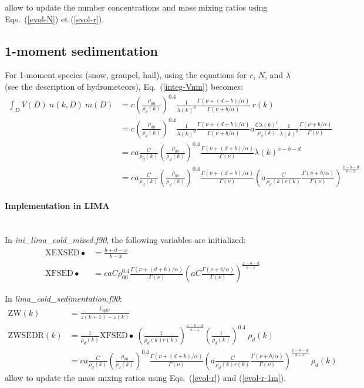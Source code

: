 allow to update the number concentrations and mass mixing ratios using Eqs.\ (\ref{evol-N}) et (\ref{evol-r}).

\subsection{1-moment sedimentation}

For 1-moment species (snow, graupel, hail), using the equations for $r$, $N$, and $\lambda$ (see the description of hydrometeors), Eq.\ (\ref{integ-Vnm}) becomes:
\begin{align}
 \int_D V(D)~n(k,D)~m(D) &= c \left(\frac{\rho_{00}}{\rho_d(k)}\right)^{0.4} \frac{1}{\lambda(k)^d} \frac{\Gamma(\nu+(d+b)/\alpha)}{\Gamma(\nu+b/\alpha)} ~ r(k) \\
 &= c \left(\frac{\rho_{00}}{\rho_d(k)}\right)^{0.4} \frac{1}{\lambda(k)^d} \frac{\Gamma(\nu+(d+b)/\alpha)}{\Gamma(\nu+b/\alpha)} a \frac{C \lambda(k)^{x}}{\rho_d(k)}\frac{1}{\lambda(k)^b} \frac{\Gamma(\nu + b/\alpha)}{\Gamma(\nu)} \\
 &= ca\frac{C}{\rho_d(k)} \left(\frac{\rho_{00}}{\rho_d(k)}\right)^{0.4} \frac{\Gamma(\nu+(d+b)/\alpha)}{\Gamma(\nu)} \lambda(k)^{x-b-d} \\
 \label{evol-r-1m}
 &= ca\frac{C}{\rho_d(k)} \left(\frac{\rho_{00}}{\rho_d(k)}\right)^{0.4} \frac{\Gamma(\nu+(d+b)/\alpha)}{\Gamma(\nu)} \left( a \frac{C}{\rho_d(k) r(k)} \frac{\Gamma(\nu+b/\alpha)}{\Gamma(\nu)}\right)^{\frac{x-b-d}{b-x}}
\end{align}

\paragraph{Implementation in LIMA}
~\\
In \emph{ini\_lima\_cold\_mixed.f90}, the following variables are initialized:
\begin{align}
 \mathrm{XEXSED\bullet} &= \frac{b+d-x}{b-x} \\
 \mathrm{XFSED\bullet} &= caC \rho_{00}^{0.4} \frac{\Gamma(\nu+(d+b)/\alpha)}{\Gamma(\nu)} \left( aC \frac{\Gamma(\nu+b/\alpha)}{\Gamma(\nu)} \right)^{\frac{x-b-d}{b-x}}
\end{align}

In \emph{lima\_cold\_sedimentation.f90}:
\begin{align}
 \mathrm{ZW}(k) &= \frac{t_{split}}{z(k+1)-z(k)} \\
 \mathrm{ZWSEDR}(k) &= \frac{1}{\rho_d(k)} \mathrm{XFSED\bullet} ~ \left(\frac{1}{\rho_d(k) r(k)}\right)^{\frac{x-b-d}{b-x}} \left(\frac{1}{\rho_d(k)}\right)^{0.4} ~ \rho_d(k) \\
 &= ca\frac{C}{\rho_d(k)} \left(\frac{\rho_{00}}{\rho_d(k)}\right)^{0.4} \frac{\Gamma(\nu+(d+b)/\alpha)}{\Gamma(\nu)} \left( a \frac{C}{\rho_d(k)r(k)} \frac{\Gamma(\nu+b/\alpha)}{\Gamma(\nu)}\right)^{\frac{x-b-d}{b-x}} ~ \rho_d(k)
\end{align}
allow to update the mass mixing ratios using Eqs.\ (\ref{evol-r}) and (\ref{evol-r-1m}).





